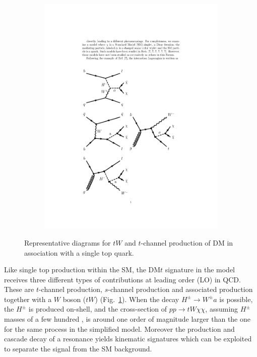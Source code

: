 \begin{figure}
\begin{center}
\begin{subfigure}{.23\textwidth}
\includegraphics[width=\textwidth]{texinputs/04_grid/figures/DMHF/Pfeyn_tchan_2}
\caption{}
\end{subfigure}
\caption{Representative diagrams for $tW$ and $t$-channel production of DM in association with a single top quark.}
\label{fig:feyn1}
\end{center}
\end{figure}


Like single top production within the SM, the DM$t$ signature in the model
 receives  three different types of contributions at leading order (LO) in QCD. These are $t$-channel production, $s$-channel production and
associated production together with a $W$ boson ($tW$) (Fig.~\ref{fig:feyn1}).
When the decay $H^{\pm}\rightarrow W^{\pm} a$ is possible, the $H^{\pm}$ is produced on-shell, 
and the cross-section of $pp \rightarrow tW\chi\chi$, 
assuming  $H^{\pm}$ masses of a few hundred \GeV, is around one order of magnitude larger 
than the one for the same process in the simplified model. Moreover the production 
and cascade decay of a resonance yields kinematic signatures
which can be exploited to separate the signal from the SM background. 


